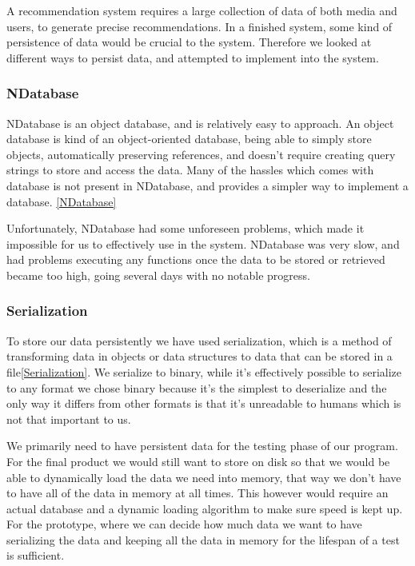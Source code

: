 A recommendation system requires a large collection of data of both media and users, to generate precise recommendations. In a finished system, some kind of persistence of data would be crucial to the system. Therefore we looked at different ways to persist data, and attempted to implement into the system.

\subsubsection{NDatabase}

NDatabase is an object database, and is relatively easy to approach. An object database is kind of an object-oriented database, being able to simply store objects, automatically preserving references, and doesn’t require creating query strings to store and access the data. Many of the hassles which comes with database is not present in NDatabase, and provides a simpler way to implement a database. \ref{NDatabase}

Unfortunately, NDatabase had some unforeseen problems, which made it impossible for us to effectively use in the system. NDatabase was very slow, and had problems executing any functions once the data to be stored or retrieved became too high, going several days with no notable progress.

\subsubsection{Serialization}

To store our data persistently we have used serialization, which is a method of transforming data in objects or data structures to data that can be stored in a file\ref{Serialization}. We serialize to binary, while it’s effectively possible to serialize to any format we chose binary because it’s the simplest to deserialize and the only way it differs from other formats is that it’s unreadable to humans which is not that important to us. 

We primarily need to have persistent data for the testing phase of our program. For the final product we would still want to store on disk so that we would be able to dynamically load the data we need into memory, that way we don’t have to have all of the data in memory at all times. This however would require an actual database and a dynamic loading algorithm to make sure speed is kept up. For the prototype, where we can decide how much data we want to have serializing the data and keeping all the data in memory for the lifespan of a test is sufficient.